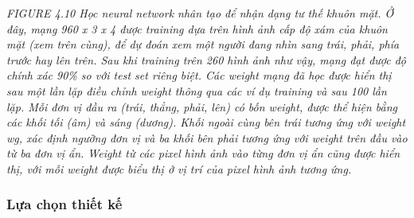 \noindent\textit{FIGURE 4.10 Học neural network nhân tạo để nhận dạng tư thế khuôn mặt. Ở đây, mạng 960 x 3 x 4 được training dựa trên hình ảnh cấp độ xám của khuôn mặt (xem trên cùng), để dự đoán xem một người đang nhìn sang trái, phải, phía trước hay lên trên. Sau khi training trên 260 hình ảnh như vậy, mạng đạt được độ chính xác 90\% so với test set riêng biệt. Các weight mạng đã học được hiển thị sau một lần lặp điều chỉnh weight thông qua các ví dụ training và sau 100 lần lặp. Mỗi đơn vị đầu ra (trái, thẳng, phải, lên) có bốn weight, được thể hiện bằng các khối tối (âm) và sáng (dương). Khối ngoài cùng bên trái tương ứng với weight wg, xác định ngưỡng đơn vị và ba khối bên phải tương ứng với weight trên đầu vào từ ba đơn vị ẩn. Weight từ các pixel hình ảnh vào từng đơn vị ẩn cũng được hiển thị, với mỗi weight được biểu thị ở vị trí của pixel hình ảnh tương ứng.}

\subsubsection{Lựa chọn thiết kế}

